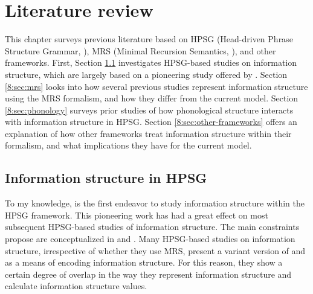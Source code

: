 \chapter{Literature review}
\label{chapter8}
\setcounter{enums}{0}


\noindent This chapter surveys previous literature based on HPSG
(Head-driven Phrase Structure Grammar,
\citealt{pollard:sag:94}), MRS (Minimal Recursion Semantics,
\citealt{copestake:etal:05}), and other frameworks. First,
Section \ref{8:sec:hpsg} investigates HPSG-based studies on information
structure, which are largely based on a pioneering study offered by
\citet{engdahl:vallduvi:96}.  Section \ref{8:sec:mrs} looks into how several
previous studies represent information structure using the MRS
formalism, and how they differ from the current model.
Section \ref{8:sec:phonology} surveys prior studies of how phonological
structure interacts with information structure in HPSG.
Section \ref{8:sec:other-frameworks} offers an explanation of how other
frameworks treat information structure within their formalism, and
what implications they have for the current model.


\section{Information structure in HPSG}
\label{8:sec:hpsg}


To my knowledge, \citet{engdahl:vallduvi:96} is the first endeavor to
study information structure within the HPSG framework. This
pioneering work has had a great effect on most subsequent HPSG-based
studies of information structure. The main constraints
\citet{engdahl:vallduvi:96} propose are conceptualized in
 and .
Many HPSG-based studies on information structure, irrespective of
whether they use MRS, present a variant version of
 and  as
a means of encoding information structure.  For this reason, they show
a certain degree of overlap in the way they represent information
structure and calculate information structure values.




